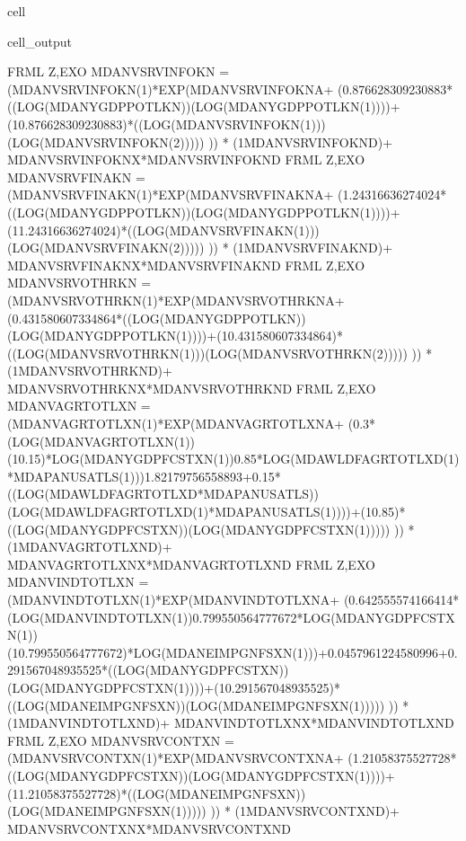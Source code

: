 \documentclass[letterpaper,10pt,english]{jupyterBook}
\begin{document}
\begin{sphinxuseclass}{cell}
\begin{sphinxVerbatimOutput}
\begin{sphinxuseclass}{cell_output}
\begin{sphinxVerbatim}[commandchars=\\\{\}]
FRML \PYGZlt{}Z,EXO\PYGZgt{} MDANVSRVINFOKN = (MDANVSRVINFOKN(\PYGZhy{}1)*EXP(MDANVSRVINFOKN\PYGZus{}A+ (0.876628309230883*((LOG(MDANYGDPPOTLKN))\PYGZhy{}(LOG(MDANYGDPPOTLKN(\PYGZhy{}1))))+(1\PYGZhy{}0.876628309230883)*((LOG(MDANVSRVINFOKN(\PYGZhy{}1)))\PYGZhy{}(LOG(MDANVSRVINFOKN(\PYGZhy{}2))))) )) * (1\PYGZhy{}MDANVSRVINFOKN\PYGZus{}D)+ MDANVSRVINFOKN\PYGZus{}X*MDANVSRVINFOKN\PYGZus{}D  \PYGZdl{}
FRML \PYGZlt{}Z,EXO\PYGZgt{} MDANVSRVFINAKN = (MDANVSRVFINAKN(\PYGZhy{}1)*EXP(MDANVSRVFINAKN\PYGZus{}A+ (1.24316636274024*((LOG(MDANYGDPPOTLKN))\PYGZhy{}(LOG(MDANYGDPPOTLKN(\PYGZhy{}1))))+(1\PYGZhy{}1.24316636274024)*((LOG(MDANVSRVFINAKN(\PYGZhy{}1)))\PYGZhy{}(LOG(MDANVSRVFINAKN(\PYGZhy{}2))))) )) * (1\PYGZhy{}MDANVSRVFINAKN\PYGZus{}D)+ MDANVSRVFINAKN\PYGZus{}X*MDANVSRVFINAKN\PYGZus{}D  \PYGZdl{}
FRML \PYGZlt{}Z,EXO\PYGZgt{} MDANVSRVOTHRKN = (MDANVSRVOTHRKN(\PYGZhy{}1)*EXP(MDANVSRVOTHRKN\PYGZus{}A+ (0.431580607334864*((LOG(MDANYGDPPOTLKN))\PYGZhy{}(LOG(MDANYGDPPOTLKN(\PYGZhy{}1))))+(1\PYGZhy{}0.431580607334864)*((LOG(MDANVSRVOTHRKN(\PYGZhy{}1)))\PYGZhy{}(LOG(MDANVSRVOTHRKN(\PYGZhy{}2))))) )) * (1\PYGZhy{}MDANVSRVOTHRKN\PYGZus{}D)+ MDANVSRVOTHRKN\PYGZus{}X*MDANVSRVOTHRKN\PYGZus{}D  \PYGZdl{}
FRML \PYGZlt{}Z,EXO\PYGZgt{} MDANVAGRTOTLXN = (MDANVAGRTOTLXN(\PYGZhy{}1)*EXP(MDANVAGRTOTLXN\PYGZus{}A+ (\PYGZhy{}0.3*(LOG(MDANVAGRTOTLXN(\PYGZhy{}1))\PYGZhy{}(1\PYGZhy{}0.15)*LOG(MDANYGDPFCSTXN(\PYGZhy{}1))\PYGZhy{}0.85*LOG(MDAWLDFAGRTOTLXD(\PYGZhy{}1)*MDAPANUSATLS(\PYGZhy{}1)))\PYGZhy{}1.82179756558893+0.15*((LOG(MDAWLDFAGRTOTLXD*MDAPANUSATLS))\PYGZhy{}(LOG(MDAWLDFAGRTOTLXD(\PYGZhy{}1)*MDAPANUSATLS(\PYGZhy{}1))))+(1\PYGZhy{}0.85)*((LOG(MDANYGDPFCSTXN))\PYGZhy{}(LOG(MDANYGDPFCSTXN(\PYGZhy{}1))))) )) * (1\PYGZhy{}MDANVAGRTOTLXN\PYGZus{}D)+ MDANVAGRTOTLXN\PYGZus{}X*MDANVAGRTOTLXN\PYGZus{}D  \PYGZdl{}
FRML \PYGZlt{}Z,EXO\PYGZgt{} MDANVINDTOTLXN = (MDANVINDTOTLXN(\PYGZhy{}1)*EXP(MDANVINDTOTLXN\PYGZus{}A+ (\PYGZhy{}0.642555574166414*(LOG(MDANVINDTOTLXN(\PYGZhy{}1))\PYGZhy{}0.799550564777672*LOG(MDANYGDPFCSTXN(\PYGZhy{}1))\PYGZhy{}(1\PYGZhy{}0.799550564777672)*LOG(MDANEIMPGNFSXN(\PYGZhy{}1)))+0.0457961224580996+0.291567048935525*((LOG(MDANYGDPFCSTXN))\PYGZhy{}(LOG(MDANYGDPFCSTXN(\PYGZhy{}1))))+(1\PYGZhy{}0.291567048935525)*((LOG(MDANEIMPGNFSXN))\PYGZhy{}(LOG(MDANEIMPGNFSXN(\PYGZhy{}1))))) )) * (1\PYGZhy{}MDANVINDTOTLXN\PYGZus{}D)+ MDANVINDTOTLXN\PYGZus{}X*MDANVINDTOTLXN\PYGZus{}D  \PYGZdl{}
FRML \PYGZlt{}Z,EXO\PYGZgt{} MDANVSRVCONTXN = (MDANVSRVCONTXN(\PYGZhy{}1)*EXP(MDANVSRVCONTXN\PYGZus{}A+ (1.21058375527728*((LOG(MDANYGDPFCSTXN))\PYGZhy{}(LOG(MDANYGDPFCSTXN(\PYGZhy{}1))))+(1\PYGZhy{}1.21058375527728)*((LOG(MDANEIMPGNFSXN))\PYGZhy{}(LOG(MDANEIMPGNFSXN(\PYGZhy{}1))))) )) * (1\PYGZhy{}MDANVSRVCONTXN\PYGZus{}D)+ MDANVSRVCONTXN\PYGZus{}X*MDANVSRVCONTXN\PYGZus{}D  \PYGZdl{}

\end{sphinxVerbatim}
\end{sphinxuseclass}
\end{sphinxVerbatimOutput}
\end{sphinxuseclass}
\end{document}
